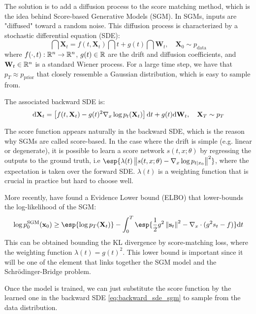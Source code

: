 \documentclass{article}
\begin{document}
The solution is to add a diffusion process to the score matching method, which is the idea behind Score-based Generative Models (SGM).
In SGMs, inputs are "diffused" toward a random noise.
This diffusion process is characterized by a stochastic differential equation (SDE):
\begin{equation}
    \dint{\mathbf{X}_t} = f(t,\mathbf{X}_t)\dint{t} + g(t) \dint{\mathbf{W}_t}, \quad \mathbf{X}_0 \sim p_\mathrm{data}
    \label{eq:forward_sde_sgm}
\end{equation}
where $f(\cdot, t) : \mathbb{R}^n \rightarrow \mathbb{R}^n$, $g(t) \in \mathbb{R}$ are the drift and diffusion coefficients, and $\mathbf{W}_t \in \mathbb{R}^n$ is a standard Wiener process.
For a large time step, we have that $p_T \approx p_\mathrm{prior}$ that closely ressemble a Gaussian distribution, which is easy to sample from.

The associated backward SDE is:
\begin{equation}
    \mathrm{d}{\mathbf{X}_t} = \left\lbrack f(t,\mathbf{X}_t) - g(t)^2\nabla_x\log p_t(\mathbf{X}_t) \right\rbrack\mathrm{d}{t} + g(t) \mathrm{d}{\mathbf{W}_t}, \quad \mathbf{X}_T \sim p_T
    \label{eq:backward_sde_sgm}
\end{equation}

The score function appears naturally in the backward SDE, which is the reason why SGMs are called score-based. In the case where the drift is simple (e.g. linear or degenerate), it is possible to learn a score network $s(t, x; \theta)$ by regressing the outputs to the ground truth, i.e $\esp{\lambda(t) \norme{s(t, x; \theta) - \nabla_x \log p_{t|x_0}}^2}$, where the expectation is taken over the forward SDE.
$\lambda(t)$ is a weighting function that is crucial in practice but hard to choose well.

More recently, \citet{song2021maximum} have found a Evidence Lower bound (ELBO) that lower-bounds the log-likelihood of the SGM:
\begin{equation}
\log p_0^\mathrm{SGM}(\mathbf{x}_0)
\ge
\esp{\log p_T(\mathbf{X}_t)}
- \int_0^T
\esp{\frac{1}{2}g^2\norme{\mathbf{s}_t}^2
- \nabla_x \cdot (g^2 s_t - f)}
\dint t
\end{equation}
This can be obtained bounding the KL divergence by score-matching loss, where the weighting function $\lambda(t) = g(t)^2$.
This lower bound is important since it will be one of the element that links together the SGM model and the Schrödinger-Bridge problem.

Once the model is trained, we can just substitute the score function by the learned one in the backward SDE \eqref{eq:backward_sde_sgm} to sample from the data distribution.
\end{document}
